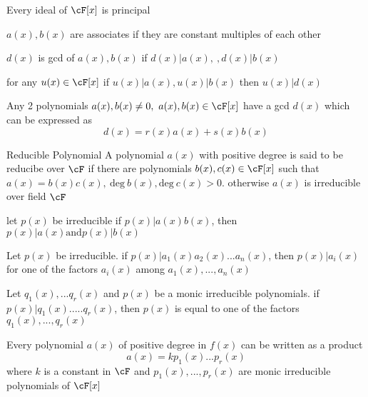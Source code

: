 \documentclass[11pt, oneside, dvipdfmx]{book}
\begin{document}
\begin{MyTheorem}
Every ideal of $\cF[x]$ is principal
\end{MyTheorem}

\begin{description}
\item $a(x) ,b(x)$ are associates if they are constant multiples of each other

\item $d(x)$ is gcd of $a(x),b(x)$ if $d(x)|a(x),~,d(x)|b(x)$

\item for any $u(x) \in \cF[x]$ if $u(x) | a(x), u(x) | b(x)$ then $u(x)|d(x)$
\end{description}

\begin{MyTheorem}
Any 2 polynomials $a(x), b(x) \neq 0,~a(x),b(x) \in \cF[x]$ have a gcd $d(x)$ which can be expressed as $$ d(x) = r(x)a(x) + s(x)b(x)$$
\end{MyTheorem}

\begin{MyDefinition}{Reducible Polynomial}
A polynomial $a(x)$ with positive degree is said to be reducibe over $\cF$ if there are polynomials $b(x),c(x) \in \cF[x]$ such that $a(x) =b(x)c(x),~ \text{deg} ~b(x),\text{deg} ~c(x)>0$. otherwise $a(x)$ is irreducible over field $\cF$
\end{MyDefinition}

\begin{lemma}
let $p(x)$ be irreducible if $p(x)|a(x)b(x)$, then $p(x)|a(x) \text{and} p(x)|b(x)$
\end{lemma}

\begin{corollary}
Let $p(x)$ be irreducible. if $p(x)|a_1(x)a_2(x)...a_n(x)$, then $p(x)|a_i(x)$ for one of the factors $a_i(x)$ among $a_1(x),...,a_n(x)$
\end{corollary}

\begin{corollary}
Let $q_1(x),...q_r(x)$ and $p(x)$ be a monic irreducible polynomials. if $p(x)|q_1(x).....q_r(x)$, then $p(x)$ is equal to one of the factors $q_1(x),...,q_r(x)$ 
\end{corollary}

\begin{MyTheorem}
Every polynomial $a(x)$ of positive degree in $f(x)$ can be written as a product $$ a(x) = kp_1(x)...p_r(x)$$ where $k$ is a constant in $\cF$ and $p_1(x),...,p_r(x)$ are monic irreducible polynomials of $\cF[x]$
\end{MyTheorem}
\end{document}
